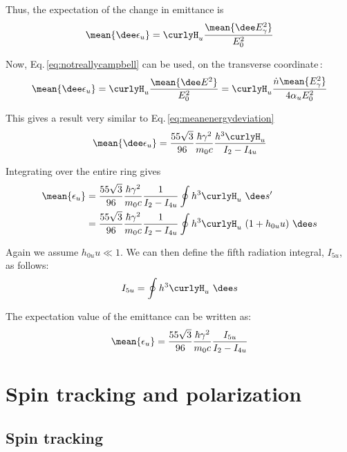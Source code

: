 Thus, the expectation of the change in emittance is
\begin{equation}
    \mean{\dee \epsilon_u} = \curlyH_u \frac{\mean{\dee E_\gamma^2}}{E_0^2}
\end{equation}

Now, Eq.\,\ref{eq:notreallycampbell} can be used, on the transverse coordinate\,\cite{hofmann_2004}:
\begin{equation}
    \mean{\dee \epsilon_u} = \curlyH_u \frac{\mean{\dee E^2}}{E_0^2}
    = \curlyH_u \frac{\dot{n} \mean{E_\gamma^2}}{4 \alpha_u E_0^2}
\end{equation}

This gives a result very similar to Eq.\,\ref{eq:meanenergydeviation}
\begin{equation}
\mean{\dee \epsilon_u} = \frac{55 \sqrt{3}}{96} \frac{\hbar \gamma^2}{m_0 c} \frac{h^3 \curlyH_u}{I_2 - I_{4u}}
\end{equation}

Integrating over the entire ring gives
\begin{align}
    \mean{\epsilon_u} &= \frac{55 \sqrt{3}}{96} \frac{\hbar \gamma^2}{m_0 c}
    \frac{1}{I_2 - I_{4u}}\oint h^3 \curlyH_u\ \dee s'\notag\\
    &= \frac{55 \sqrt{3}}{96} \frac{\hbar \gamma^2}{m_0 c}
    \frac{1}{I_2 - I_{4u}}\oint h^3 \curlyH_u\ (1 + h_{0u}u)\ \dee s
\end{align}

Again we assume $h_{0u} u \ll 1$. We can then define the fifth radiation integral, $I_{5u}$, as follows:
\begin{equation}
    I_{5u} = \oint h^3 \curlyH_u\ \dee s
\end{equation}

The expectation value of the emittance can be written as:
\begin{equation}
    \mean{\epsilon_u} = \frac{55 \sqrt{3}}{96} \frac{\hbar \gamma^2}{m_0 c} \frac{I_{5u}}{I_2 - I_{4u}}
\end{equation}



\chapter{Spin tracking and polarization}

\section{Spin tracking}

